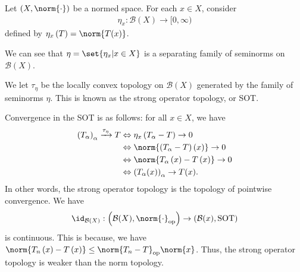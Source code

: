 \documentclass[10pt]{mypackage}
\begin{document}
\begin{example}
  Let $\left(X,\norm{\cdot}\right)$ be a normed space. For each $x\in X$, consider
  \begin{align*}
    \eta_{x}: \mathcal{B}(X) \rightarrow [0,\infty)
  \end{align*}
  defined by $\eta_{x}\left(T\right) = \norm{T(x)}$.\newline

  We can see that $\eta = \set{\eta_x | x\in X}$ is a separating family of seminorms on $\mathcal{B}(X)$.\newline

  We let $\tau_{\eta}$ be the locally convex topology on $\mathcal{B}\left(X\right)$ generated by the family of seminorms $\eta$. This is known as the strong operator topology, or SOT.\newline

  Convergence in the SOT is as follows: for all $x\in X$, we have
  \begin{align*}
    \left(T_{\alpha}\right)_{\alpha}\xrightarrow{\tau_{\eta}} T &\Leftrightarrow \eta_{x}\left(T_{\alpha} - T\right)\rightarrow 0\\
                                                                &\Leftrightarrow \norm{\left(T_{\alpha} - T\right)\left(x\right)} \rightarrow 0\\
                                                                &\Leftrightarrow \norm{T_{\alpha}\left(x\right) - T\left(x\right)}\rightarrow 0\\
                                                                &\Leftrightarrow \left(T_{\alpha}(x)\right)_{\alpha}\rightarrow T(x).
  \end{align*}
  In other words, the strong operator topology is the topology of pointwise convergence. We have
  \begin{align*}
    \id_{\mathcal{B}(X)}: \left(\mathcal{B}(X),\norm{\cdot}_{\text{op}}\right) \rightarrow \left(\mathcal{B}(x),\text{SOT}\right)
  \end{align*}
  is continuous. This is because, we have $\norm{T_{n}\left(x\right) - T\left(x\right)}\leq \norm{T_n - T}_{\text{op}} \norm{x}$. Thus, the strong operator topology is weaker than the norm topology.\newline


\end{example}
\end{document}
